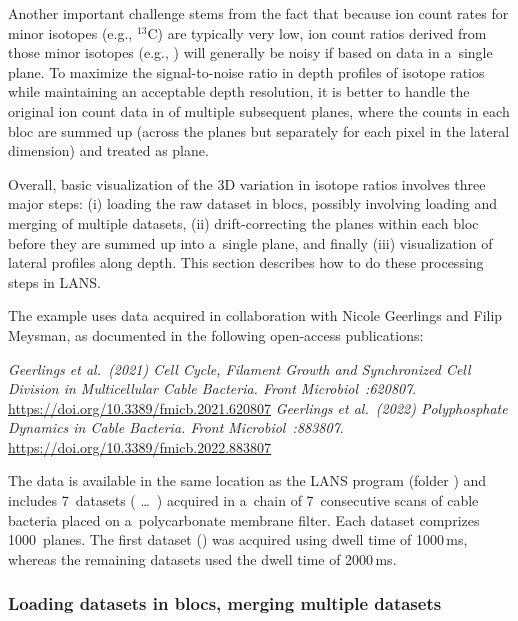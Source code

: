 Another important challenge stems from the fact that because ion count rates for minor isotopes (e.g., ${}^{13}\mathrm{C}$) are typically very low, ion count ratios derived from those minor isotopes (e.g., ) will generally be noisy if based on data in a~single plane. To maximize the signal-to-noise ratio in depth profiles of isotope ratios while maintaining an acceptable depth resolution, it is better to handle the original ion count data in  of multiple subsequent planes, where the counts in each bloc are summed up (across the planes but separately for each pixel in the lateral dimension) and treated as  plane.  

Overall, basic visualization of the 3D variation in isotope ratios involves three major steps: (i) loading the raw dataset in blocs, possibly involving loading and merging of multiple datasets, (ii) drift-correcting the planes within each bloc before they are summed up into a~single plane, and finally (iii) visualization of lateral profiles along depth. This section describes how to do these processing steps in LANS. 

The example uses data acquired in collaboration with Nicole Geerlings and Filip Meysman, as documented in the following open-access publications:
\vskip1mm
\begin{center}
\begin{minipage}{0.93\textwidth}
\textsl{\small Geerlings et al.~(2021) Cell Cycle, Filament Growth and Synchronized Cell Division in Multicellular Cable Bacteria. \emph{Front Microbiol}~:620807}. \url{https://doi.org/10.3389/fmicb.2021.620807}
\vskip1mm
\textsl{\small Geerlings et al.~(2022) Polyphosphate Dynamics in Cable Bacteria. \emph{Front Microbiol}~:883807}. \url{https://doi.org/10.3389/fmicb.2022.883807}
\end{minipage}
\end{center}
\vskip1mm
The data is available in the same location as the LANS program (folder ) and includes 7~datasets ( \dots\ ) acquired in a~chain of 7~consecutive scans of cable bacteria placed on a~polycarbonate membrane filter. Each dataset comprizes 1000~planes. The first dataset () was acquired using dwell time of 1000\,ms, whereas the remaining datasets used the dwell time of 2000\,ms.

\subsubsection{Loading datasets in blocs, merging multiple datasets}
\setcounter{step}{0}

